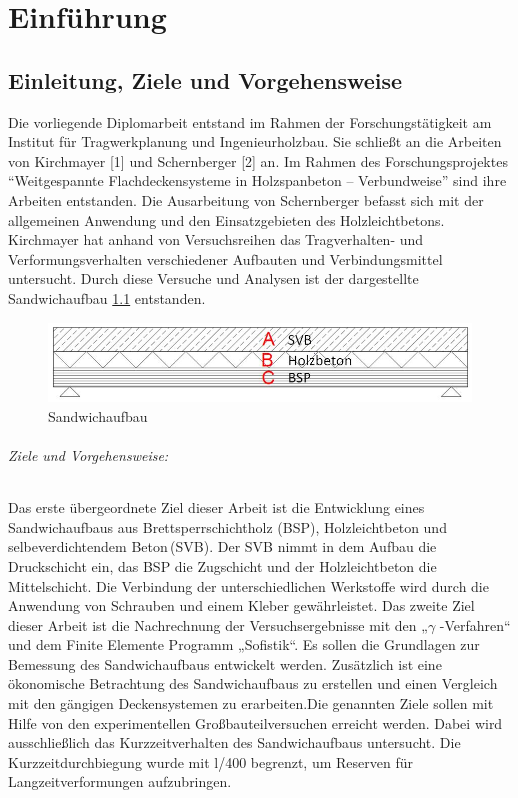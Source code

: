 
\chapter{Einführung}
\section{Einleitung, Ziele und Vorgehensweise}
 

Die vorliegende Diplomarbeit entstand im Rahmen  der Forschungstätigkeit am Institut für Tragwerkplanung und Ingenieurholzbau. Sie schließt an die Arbeiten von  Kirchmayer [1] \cite{1} und  Schernberger [2] an. Im Rahmen des Forschungsprojektes "`Weitgespannte Flachdeckensysteme in Holzspanbeton – Verbundweise"'  sind ihre Arbeiten entstanden. Die Ausarbeitung von Schernberger befasst sich mit der allgemeinen Anwendung und den Einsatzgebieten des Holzleichtbetons. Kirchmayer hat anhand von Versuchsreihen das Tragverhalten- und Verformungsverhalten verschiedener Aufbauten und Verbindungsmittel untersucht.  Durch diese Versuche und Analysen ist der dargestellte Sandwichaufbau \ref{sandwich} entstanden. 



\begin{figure}[h!]
\begin{center}
\includegraphics[scale=0.7]{Einleitung/sandwichaufbau.JPG}
\caption{Sandwichaufbau}
\label{sandwich}
\end{center}
\end{figure}

\subparagraph{Ziele und Vorgehensweise:}

Das erste übergeordnete Ziel dieser Arbeit ist die Entwicklung eines Sandwichaufbaus aus Brettsperrschichtholz (BSP), Holzleichtbeton und selbeverdichtendem Beton\,(SVB). Der SVB nimmt in dem Aufbau die Druckschicht ein, das BSP die Zugschicht und der Holzleichtbeton die Mittelschicht. Die Verbindung der unterschiedlichen Werkstoffe wird durch die Anwendung von Schrauben und einem Kleber gewährleistet. Das zweite Ziel dieser Arbeit ist die Nachrechnung der Versuchsergebnisse mit den „$\gamma$ -Verfahren“ und dem Finite Elemente Programm „Sofistik“. Es sollen die Grundlagen zur Bemessung des Sandwichaufbaus entwickelt werden. 
Zusätzlich ist eine ökonomische Betrachtung des Sandwichaufbaus zu erstellen und einen Vergleich mit den gängigen Deckensystemen zu erarbeiten.\newline Die genannten Ziele sollen mit Hilfe von den experimentellen Großbauteilversuchen erreicht werden. Dabei wird ausschließlich das Kurzzeitverhalten des Sandwichaufbaus untersucht. Die Kurzzeitdurchbiegung wurde mit l/400 begrenzt, um Reserven für Langzeitverformungen aufzubringen.





